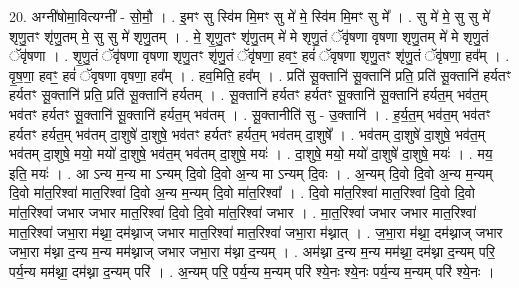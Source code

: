 \documentclass[17pt]{extarticle}
\begin{document}
20. अग्नी॑षोमा॒वित्यग्नी᳚ - सो॒मौ॒ । . इ॒मꣳ सु स्वि॑म मि॒मꣳ सु मे॑ मे॒ स्वि॑म मि॒मꣳ सु मे᳚ । . सु मे॑ मे॒ सु सु मे॑ शृणु॒तꣳ शृ॑णु॒तम् मे॒ सु सु मे॑ शृणु॒तम् । . मे॒ शृ॒णु॒तꣳ शृ॑णु॒तम् मे॑ मे शृणु॒तं ॅवृ॑षणा वृषणा शृणु॒तम् मे॑ मे शृणु॒तं ॅवृ॑षणा । . शृ॒णु॒तं ॅवृ॑षणा वृषणा शृणु॒तꣳ शृ॑णु॒तं ॅवृ॑षणा॒ हवꣳ॒॒ हवं॑ ॅवृषणा शृणु॒तꣳ शृ॑णु॒तं ॅवृ॑षणा॒ हव᳚म् । . वृ॒ष॒णा॒ हवꣳ॒॒ हवं॑ ॅवृषणा वृषणा॒ हव᳚म् । . हव॒मिति॒ हव᳚म् । . प्रति॑ सू॒क्तानि॑ सू॒क्तानि॑ प्रति॒ प्रति॑ सू॒क्तानि॑ हर्यतꣳ हर्यतꣳ सू॒क्तानि॑ प्रति॒ प्रति॑ सू॒क्तानि॑ हर्यतम् । . सू॒क्तानि॑ हर्यतꣳ हर्यतꣳ सू॒क्तानि॑ सू॒क्तानि॑ हर्यत॒म् भव॑त॒म् भव॑तꣳ हर्यतꣳ सू॒क्तानि॑ सू॒क्तानि॑ हर्यत॒म् भव॑तम् । . सू॒क्तानीति॑ सु - उ॒क्तानि॑ । . ह॒र्य॒त॒म् भव॑त॒म् भव॑तꣳ हर्यतꣳ हर्यत॒म् भव॑तम् दा॒शुषे॑ दा॒शुषे॒ भव॑तꣳ हर्यतꣳ हर्यत॒म् भव॑तम् दा॒शुषे᳚ । . भव॑तम् दा॒शुषे॑ दा॒शुषे॒ भव॑त॒म् भव॑तम् दा॒शुषे॒ मयो॒ मयो॑ दा॒शुषे॒ भव॑त॒म् भव॑तम् दा॒शुषे॒ मयः॑ । . दा॒शुषे॒ मयो॒ मयो॑ दा॒शुषे॑ दा॒शुषे॒ मयः॑ । . मय॒ इति॒ मयः॑ । . आ ऽन्य म॒न्य मा ऽन्यम् दि॒वो दि॒वो अ॒न्य मा ऽन्यम् दि॒वः । . अ॒न्यम् दि॒वो दि॒वो अ॒न्य म॒न्यम् दि॒वो मा॑त॒रिश्वा॑ मात॒रिश्वा॑ दि॒वो अ॒न्य म॒न्यम् दि॒वो मा॑त॒रिश्वा᳚ । . दि॒वो मा॑त॒रिश्वा॑ मात॒रिश्वा॑ दि॒वो दि॒वो मा॑त॒रिश्वा॑ जभार जभार मात॒रिश्वा॑ दि॒वो दि॒वो मा॑त॒रिश्वा॑ जभार । . मा॒त॒रिश्वा॑ जभार जभार मात॒रिश्वा॑ मात॒रिश्वा॑ जभा॒रा म॑थ्ना॒ दम॑थ्नाज् जभार मात॒रिश्वा॑ मात॒रिश्वा॑ जभा॒रा म॑थ्नात् । . ज॒भा॒रा म॑थ्ना॒ दम॑थ्नाज् जभार जभा॒रा म॑थ्ना द॒न्य म॒न्य मम॑थ्नाज् जभार जभा॒रा म॑थ्ना द॒न्यम् । . अम॑थ्ना द॒न्य म॒न्य मम॑थ्ना॒ दम॑थ्ना द॒न्यम् परि॒ पर्य॒न्य मम॑थ्ना॒ दम॑थ्ना द॒न्यम् परि॑ । . अ॒न्यम् परि॒ पर्य॒न्य म॒न्यम् परि॑ श्ये॒नः श्ये॒नः पर्य॒न्य म॒न्यम् परि॑ श्ये॒नः । \newline
\end{document}
